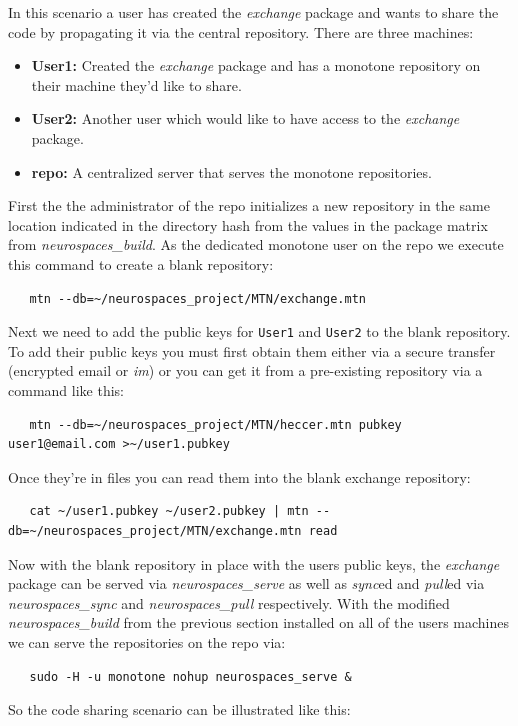 \documentclass[12pt]{article}
\begin{document}
In this scenario a user has created the {\it exchange} package and wants to share the code by propagating it via the central repository. There are three machines:
\begin{itemize}
   \item {\bf User1:} Created the {\it exchange} package and has a monotone repository on their machine they'd like to share.
   \item {\bf User2:} Another user which would like to have access to the {\it exchange} package.
   \item {\bf repo:} A centralized server that serves the monotone repositories. 
\end{itemize}
First the the administrator of the repo initializes a new repository in the same location indicated in the directory hash from the values in the package matrix from {\it neurospaces\_build}. As the dedicated monotone user on the repo we execute this command to create a blank repository:
\begin{verbatim}
   mtn --db=~/neurospaces_project/MTN/exchange.mtn
\end{verbatim}
Next we need to add the public keys for {\tt User1} and {\tt User2} to the blank repository. To add their public keys you must first obtain them either via a secure transfer (encrypted email or {\it im}) or you can get it from a pre-existing repository via a command like this:
\begin{verbatim}
   mtn --db=~/neurospaces_project/MTN/heccer.mtn pubkey user1@email.com >~/user1.pubkey
\end{verbatim}
Once they're in files you can read them into the blank exchange repository:
\begin{verbatim}
   cat ~/user1.pubkey ~/user2.pubkey | mtn --db=~/neurospaces_project/MTN/exchange.mtn read
\end{verbatim}
Now with the blank repository in place with the users public keys, the {\it exchange} package can be served via {\it neurospaces\_serve} as well as {\it sync}ed and {\it pull}ed via {\it neurospaces\_sync} and {\it neurospaces\_pull} respectively. With the modified {\it neurospaces\_build} from the previous section installed on all of the users machines we can serve the repositories on the repo via:
\begin{verbatim}
   sudo -H -u monotone nohup neurospaces_serve &
\end{verbatim}
So the code sharing scenario can be illustrated like this:
\end{document}
